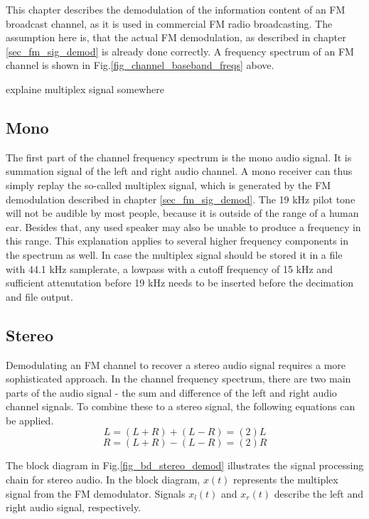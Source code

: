 This chapter describes the demodulation of the information content of an FM broadcast channel, as it is used in commercial FM radio broadcasting.
The assumption here is, that the actual FM demodulation, as described in chapter \ref{sec_fm_sig_demod} is already done correctly.
A frequency spectrum of an FM channel is shown in Fig.\ref{fig_channel_baseband_freqs} above.

explaine multiplex signal somewhere

\subsection{Mono}
\label{subsec:demod_mono}
  The first part of the channel frequency spectrum is the mono audio signal. It is summation signal of the left and right audio channel.
  A mono receiver can thus simply replay the so-called multiplex signal, which is generated by the FM demodulation described in chapter \ref{sec_fm_sig_demod}. The 19 kHz pilot tone will not be audible by most people, because it is outside of the range of a human ear. Besides that, any used speaker may also be unable to produce a frequency in this range. This explanation applies to several higher frequency components in the spectrum as well.
  In case the multiplex signal should be stored it in a file with 44.1 kHz samplerate, a lowpass with a cutoff frequency of 15 kHz and sufficient attenutation before 19 kHz needs to be inserted before the decimation and file output.

\subsection{Stereo}
  Demodulating an FM channel to recover a stereo audio signal requires a more sophisticated approach.
  In the channel frequency spectrum, there are two main parts of the audio signal - the sum and difference of the left and right audio channel signals.
  To combine these to a stereo signal, the following equations can be applied.
  \begin{equation*}
    L = (L+R) + (L-R) = (2)L
  \end{equation*}
  \begin{equation}
    R = (L+R) - (L-R) = (2)R
    \label{equ_stereo_from_sum_diff}
  \end{equation}

  The block diagram in Fig.\ref{fig_bd_stereo_demod} illustrates the signal processing chain for stereo audio. In the block diagram, $x(t)$ represents the multiplex signal from the FM demodulator. Signals $x_l(t)$ and $x_r(t)$ describe the left and right audio signal, respectively.

